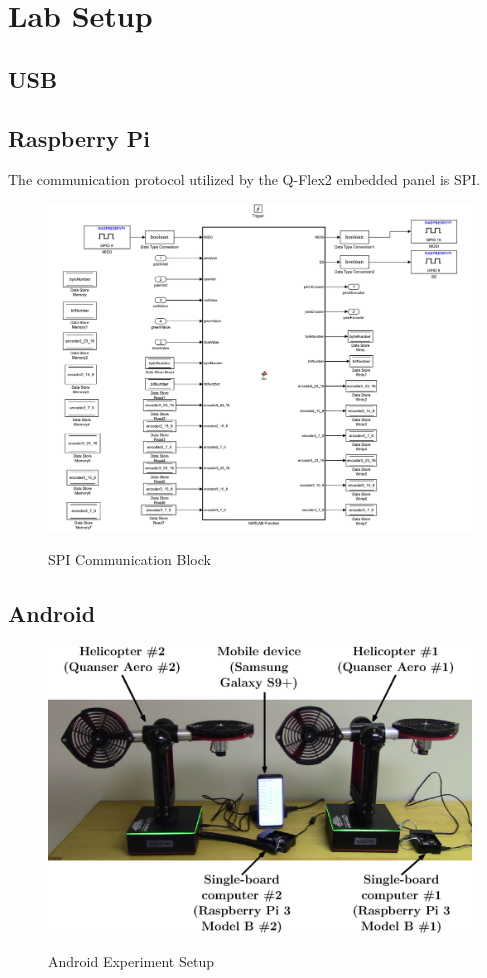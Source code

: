 \chapter{Lab Setup}

\section{USB}


\section{Raspberry Pi}
The communication protocol utilized by the Q-Flex2 embedded panel is SPI.  
\begin{figure}[!htbp]
    \centering
    \includegraphics[width=.46\textwidth,keepaspectratio=true]{figs/matlab/SPI_COM.pdf}
    \label{fig:SPI_COM}
    \caption{SPI Communication Block}
\end{figure}


\section{Android}
\begin{figure}[!htbp]
    \centering
    \includegraphics[width=.5\textwidth,keepaspectratio=true]{figs/ipe/Setup2.eps}
    \label{fig:Setup}
    \caption{Android Experiment Setup}
\end{figure}

